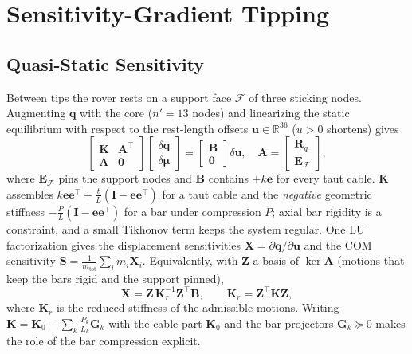 \documentclass[letterpaper,10pt,conference]{IEEEtran}
\newcommand{\vect}[1]{\boldsymbol{#1}}
\newcommand{\R}{\mathbb{R}}
\begin{document}
\section{Sensitivity-Gradient Tipping}\label{sec:sgt}

\subsection{Quasi-Static Sensitivity}
Between tips the rover rests on a support face $\mathcal F$ of three
sticking nodes. Augmenting $\vect q$ with the core ($n'=13$ nodes) and
linearizing the static equilibrium with respect to the rest-length
offsets $\vect u\in\R^{36}$ ($u>0$ shortens) gives
\begin{equation}
\begin{bmatrix}\vect K & \vect A^\top\\ \vect A & \vect 0\end{bmatrix}
\begin{bmatrix}\delta\vect q\\ \delta\vect\mu\end{bmatrix}
=\begin{bmatrix}\vect B\\ \vect 0\end{bmatrix}\delta\vect u,
\quad
\vect A=\begin{bmatrix}\vect R_q\\ \vect E_{\mathcal F}\end{bmatrix},
\label{eq:kkt}
\end{equation}
where $\vect E_{\mathcal F}$ pins the support nodes and $\vect B$
contains $\pm k\vect e$ for every taut cable. $\vect K$ assembles
$k\vect e\vect e^\top+\tfrac tL(\vect I-\vect e\vect e^\top)$ for a
taut cable and the \emph{negative} geometric stiffness
$-\tfrac PL(\vect I-\vect e\vect e^\top)$ for a bar under compression
$P$; axial bar rigidity is a constraint, and a small Tikhonov term keeps
the system regular. One LU factorization gives the displacement
sensitivities $\vect X=\partial\vect q/\partial\vect u$ and the COM
sensitivity $\vect S=\tfrac{1}{m_{\mathrm{tot}}}\sum_i m_i\vect X_i$.
Equivalently, with $\vect Z$ a basis of $\ker\vect A$ (motions that
keep the bars rigid and the support pinned),
\begin{equation}
\vect X=\vect Z\,\vect K_r^{-1}\vect Z^\top\vect B,\qquad
\vect K_r=\vect Z^\top\vect K\vect Z,
\label{eq:nullspace}
\end{equation}
where $\vect K_r$ is the reduced stiffness of the admissible motions.
Writing $\vect K=\vect K_0-\sum_k\tfrac{P_k}{L_k}\vect G_k$ with the
cable part $\vect K_0$ and the bar projectors
$\vect G_k\succeq0$ makes the role of the bar compression explicit.
\end{document}

